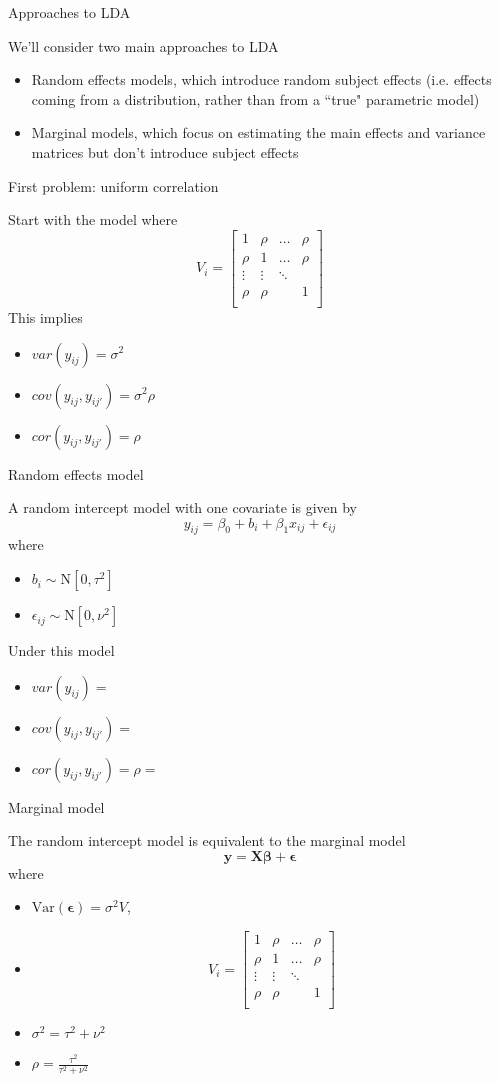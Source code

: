 \documentclass{beamer}
\newcommand{\myitem}{\item[\tiny$\blacksquare$]}
\def\by{\boldsymbol{y}}
\def\bX{\boldsymbol{X}}
\def\bbeta{\boldsymbol{\beta}}
\def\bepsilon{\boldsymbol{\epsilon}}
\newcommand{\bi}{\begin{itemize}}
\newcommand{\ei}{\end{itemize}}
\newcommand{\N}[2]{\mbox{N}\left[ #1, #2 \right] }
\newcommand{\var}{\mbox{Var}}
\newcommand{\1}{{\mathbf{1}}}
\begin{document}

\begin{frame}{Approaches to LDA}

We'll consider two main approaches to LDA
\bi
	\myitem Random effects models, which introduce random subject effects (i.e. effects coming from a distribution, rather than from a ``true" parametric model)
	\myitem Marginal models, which focus on estimating the main effects and variance matrices but don't introduce subject effects
\ei

\end{frame}



\begin{frame}{First problem: uniform correlation}

Start with the model where
$$V_{i} = \left[ \begin{array}{cccc}
			1 		& \rho	& \ldots 	& \rho \\
			\rho		& 1		& \ldots 	& \rho \\
			\vdots 	& \vdots	& \ddots 	&  \\
			\rho		& \rho	& 		& 1 \\
		 \end{array} \right]
$$
This implies 
\bi
	\myitem $var(y_{ij}) = \sigma^2$
	\myitem $cov(y_{ij}, y_{ij'})= \sigma^2 \rho$
	\myitem $cor(y_{ij},  y_{ij'})= \rho$
\ei

\end{frame}



\begin{frame}{Random effects model}

A random intercept model with one covariate is given by 
$$ y_{ij} = \beta_{0} + b_{i} + \beta_{1} x_{ij} + \epsilon_{ij}$$
where
\bi
	\myitem $b_{i} \sim \N{0}{\tau^2}$
	\myitem $\epsilon_{ij} \sim \N{0}{\nu^2}$
\ei
Under this model
\bi
	\myitem $var(y_{ij}) = $
	\myitem $cov(y_{ij}, y_{ij'}) = $
	\myitem $cor(y_{ij},  y_{ij'}) = \rho = $
\ei

\end{frame}



\begin{frame}{Marginal model}

The random intercept model is equivalent to the marginal model 
	$$ \by = \bX \bbeta + \bepsilon$$
where 
\bi
	\myitem $\var(\bepsilon) = \sigma^2 V$, 
	\myitem $$V_{i} = \left[ \begin{array}{cccc}
			1 		& \rho	& \ldots 	& \rho \\
			\rho		& 1		& \ldots 	& \rho \\
			\vdots 	& \vdots	& \ddots 	&  \\
			\rho		& \rho	& 		& 1 \\
		 \end{array} \right]
	$$
	\myitem $\sigma^2 = \tau^2 + \nu^2$
	\myitem $\rho = \frac{\tau^2}{\tau^2 + \nu^2}$
\ei

\end{frame}
\end{document}
